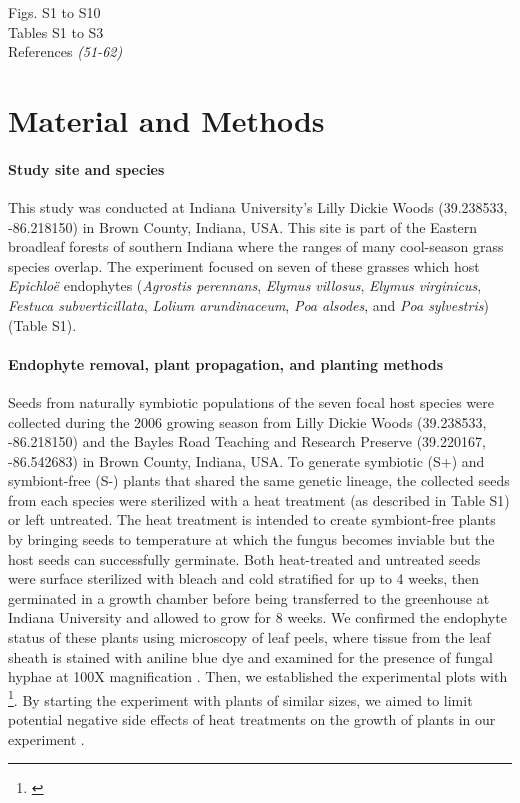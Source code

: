 \documentclass[12pt]{article}
\newcommand{\tom}[2]{{\color{red}{#1}}\footnote{\textit{\color{red}{#2}}}}
\begin{document}
Figs. S1 to S10\\
Tables S1 to S3\\
References \textit{(51-62)}


\section*{Material and Methods}
\paragraph*{Study site and species}
This study was conducted at Indiana University's Lilly Dickie Woods (39.238533, -86.218150) in Brown County, Indiana, USA. 
This site is part of the Eastern broadleaf forests of southern Indiana where the ranges of many cool-season grass species overlap. 
The experiment focused on seven of these grasses which host \emph{Epichlo\"e} endophytes (\emph{Agrostis perennans}, \emph{Elymus villosus}, \emph{Elymus virginicus}, \emph{Festuca subverticillata}, \emph{Lolium arundinaceum}, \emph{Poa alsodes}, and \emph{Poa sylvestris}) (Table S1). 


\paragraph*{Endophyte removal, plant propagation, and planting methods}
Seeds from naturally symbiotic populations of the seven focal host species were collected during the 2006 growing season from Lilly Dickie Woods (39.238533, -86.218150) and the Bayles Road Teaching and Research Preserve (39.220167, -86.542683) in Brown County, Indiana, USA. 
To generate symbiotic (S+) and symbiont-free (S-) plants that shared the same genetic lineage, the collected seeds from each species were sterilized with a heat treatment (as described in Table S1) or left untreated. 
The heat treatment is intended to create symbiont-free plants by bringing seeds to temperature at which the fungus becomes inviable but the host seeds can successfully germinate.
Both heat-treated and untreated seeds were surface sterilized with bleach and cold stratified for {\color{red}up to 4 weeks}, then germinated in a growth chamber before being transferred to the greenhouse at Indiana University and allowed to grow for {\color{red}8 weeks}. 
We confirmed the endophyte status of these plants using microscopy of leaf peels, where tissue from the leaf sheath is stained with aniline blue dye and examined for the presence of fungal hyphae at 100X magnification \cite{bacon2018stains}. 
Then, we established the experimental plots with \tom{vegetatively propagated clones of similar sizes from the plants}{not sure this happened}. 
By starting the experiment with plants of similar sizes, we aimed to limit potential negative side effects of heat treatments on the growth of plants in our experiment \cite{rudgers2009benefits}.
\end{document}
